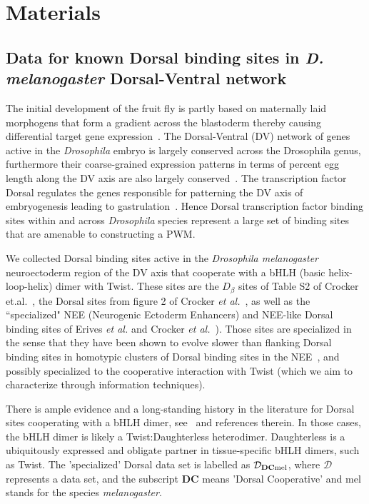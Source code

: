 \section{Materials}

\subsection{Data for known Dorsal binding sites in \textit{D. melanogaster} Dorsal-Ventral network}
The initial development of the fruit fly is partly based on maternally laid morphogens that form a gradient across the blastoderm thereby causing differential target gene expression~\cite{lawr,Hong23122008,pmid15788537}.  The Dorsal-Ventral (DV) network of genes active in the \textit{Drosophila} embryo is largely conserved across the Drosophila genus, furthermore their coarse-grained expression patterns in terms of percent egg length along the DV axis are also largely conserved~\cite{pmid19843594}.  The transcription factor Dorsal regulates the genes responsible for patterning the DV axis of embryogenesis leading to gastrulation~\cite{pmid16271864,pmid16198288,pmid17322397}.  Hence Dorsal transcription factor binding sites within and across {\it Drosophila} species represent a large set of binding sites that are amenable to constructing a PWM.

We collected Dorsal binding sites active in the \textit{Drosophila melanogaster} neuroectoderm region of the DV axis that cooperate with a bHLH (basic helix-loop-helix) dimer with Twist.  These sites are the $\textit{D}_{\beta}$ sites of Table S2 of Crocker et.al.~\cite{pmid20981027}, the Dorsal sites from figure 2 of Crocker \textit{et al.}~\cite{pmid18986212}, as well as the ``specialized" NEE (Neurogenic Ectoderm Enhancers) and NEE-like Dorsal binding sites of Erives \textit{et al.} and Crocker \textit{et al.}~\cite{pmid15026577,pmid18986212}). Those sites are specialized in the sense that they have been shown to evolve slower than flanking Dorsal binding sites in homotypic clusters of Dorsal binding sites in the NEE~\cite{pmid20981027}, and possibly specialized to the cooperative interaction with Twist (which we aim to characterize through information techniques).  

There is ample evidence and a long-standing history in the literature for Dorsal sites cooperating with a bHLH dimer, see~\cite{pmid15128669,pmid1925551,pmid16750631,pmid7774581,pmid8453668,pmid1325394} and references therein. In those cases, the bHLH dimer is likely a Twist:Daughterless heterodimer.  Daughterless is a ubiquitously expressed and obligate partner in tissue-specific bHLH dimers, such as Twist.  The 'specialized' Dorsal data set is labelled as $\mathcal D_{\textbf{DC}\rm{mel}}$, where $\mathcal D$ represents a data set, and the subscript $\textbf{DC}$ means 'Dorsal Cooperative' and mel stands for the species \textit{melanogaster}.

